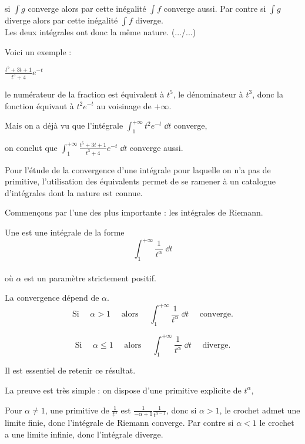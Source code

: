 si $\int g$ converge alors par cette inégalité $\int f$ converge aussi.
Par contre si $\int g$ diverge alors par cette inégalité $\int f$ diverge. 
\\
Les deux intégrales ont donc la même nature.
\hfill (.../...)

\change
\newpage

Voici un exemple : 

$\frac{t^5+3t+1}{t^3+4}e^{-t}$

\change

le numérateur de la fraction est équivalent à $t^5$, le dénominateur à $t^3$,
donc la fonction équivaut à $t^2e^{-t}$ au voisinage de $+\infty$.

\change
Mais on a déjà vu que l'intégrale 
$\int_1^{+\infty} t^2e^{-t}\;\dd t$ converge, 

\change
on conclut que $\int_1^{+\infty} \frac{t^5+3t+1}{t^3+4}e^{-t}\;\dd t$ 
converge aussi.


\diapo

Pour l'étude de la convergence d'une intégrale pour laquelle on n'a pas de primitive, 
l'utilisation des équivalents permet de se ramener 
à un catalogue d'intégrales dont la nature est connue. 

Commençons par l'une des plus importante : les intégrales de Riemann.

Une  est une intégrale de la forme 
$$\int_1^{+\infty} \frac{1}{t^{\alpha}}\;\dd t$$\\
où $\alpha$ est un paramètre strictement positif.

\change
La convergence dépend de $\alpha$.
$$\text{Si } \quad \alpha > 1\quad \text{ alors }\quad 
\int_1^{+\infty} \frac{1}{t^{\alpha}}\;\dd t \quad\text{ converge.}$$

\change
$$\text{Si } \quad \alpha\le 1\quad \text{ alors }\quad 
\int_1^{+\infty} \frac{1}{t^{\alpha}}\;\dd t \quad\text{ diverge.}$$


\change
Il est essentiel de retenir ce résultat.

\change
La preuve est très simple : on dispose d'une primitive 
explicite de $t^\alpha$, 

\change
Pour $\alpha\neq 1$, une primitive de $\frac{1}{t^{\alpha}}$ est $\tfrac{1}{-\alpha+1}\frac{1}{t^{\alpha-1}}$,
donc si $\alpha >1$, le crochet admet une limite finie, donc l'intégrale de Riemann converge.
Par contre si $\alpha<1$  le crochet a une limite infinie, donc l'intégrale diverge.

